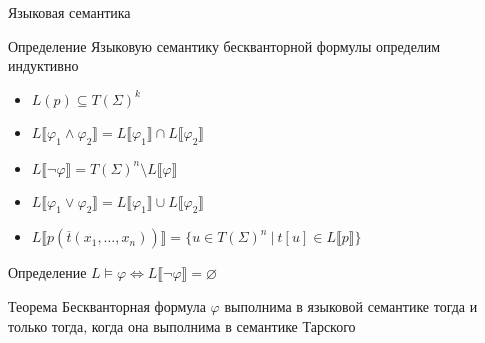 \documentclass{beamer}
\renewcommand{\phi}{\ensuremath{\varphi}}
\renewcommand{\emptyset}{\ensuremath{\varnothing}}
\begin{document}
\begin{frame}{Языковая семантика}
\begin{block}{Определение}
\small Языковую семантику бескванторной формулы определим индуктивно
\begin{minipage}{0.48\linewidth}
    \begin{itemize}
        \item $L(p) \subseteq T(\Sigma)^k$
        \item $L\llbracket \phi_1 \wedge \phi_2 \rrbracket = L \llbracket \phi_1 \rrbracket \cap L \llbracket \phi_2 \rrbracket$
    \end{itemize}
\end{minipage}
\hfill
\begin{minipage}{0.48\linewidth}
    \begin{itemize}
        \item $L\llbracket \neg \phi \rrbracket = T(\Sigma)^n \setminus L \llbracket \phi \rrbracket$
        \item $L\llbracket \phi_1 \vee \phi_2 \rrbracket = L \llbracket \phi_1 \rrbracket \cup L \llbracket \phi_2 \rrbracket$
    \end{itemize}
\end{minipage}
\begin{itemize}
    \item $L\llbracket p(\overline{t}(x_1, \ldots, x_n)) \rrbracket = \{ u \in T(\Sigma)^n \ | \ t[u] \in L\llbracket p \rrbracket \}$
\end{itemize}
\end{block}


\begin{block}{Определение}
\small $L \models \phi \iff L \llbracket \neg \phi \rrbracket = \emptyset$ 
\end{block}

\begin{block}{Теорема}
\small Бескванторная формула $\phi$ выполнима в языковой семантике тогда и только тогда, когда она выполнима в семантике Тарского
\end{block}

\end{frame}
\end{document}
